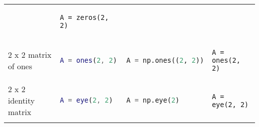 \documentclass[]{article}
\begin{document}
\begin{longtable}[]{@{}llll@{}}
\begin{minipage}[t]{0.25\columnwidth}
\strut
\end{minipage} & \begin{minipage}[t]{0.20\columnwidth}\raggedright\strut
\begin{lstlisting}
A = zeros(2, 2)
\end{lstlisting}
\strut
\end{minipage}\tabularnewline
\begin{minipage}[t]{0.24\columnwidth}\raggedright\strut
2 x 2 matrix of ones\strut
\end{minipage} & \begin{minipage}[t]{0.20\columnwidth}\raggedright\strut
\begin{lstlisting}[language=Matlab]
A = ones(2, 2)
\end{lstlisting}
\strut
\end{minipage} & \begin{minipage}[t]{0.25\columnwidth}\raggedright\strut
\begin{lstlisting}[language=Python]
A = np.ones((2, 2))
\end{lstlisting}
\strut
\end{minipage} & \begin{minipage}[t]{0.20\columnwidth}\raggedright\strut
\begin{lstlisting}
A = ones(2, 2)
\end{lstlisting}
\strut
\end{minipage}\tabularnewline
\begin{minipage}[t]{0.24\columnwidth}\raggedright\strut
2 x 2 identity matrix\strut
\end{minipage} & \begin{minipage}[t]{0.20\columnwidth}\raggedright\strut
\begin{lstlisting}[language=Matlab]
A = eye(2, 2)
\end{lstlisting}
\strut
\end{minipage} & \begin{minipage}[t]{0.25\columnwidth}\raggedright\strut
\begin{lstlisting}[language=Python]
A = np.eye(2)
\end{lstlisting}
\strut
\end{minipage} & \begin{minipage}[t]{0.20\columnwidth}\raggedright\strut
\begin{lstlisting}
A = eye(2, 2)
\end{lstlisting}
\strut
\end{minipage}\tabularnewline
\begin{minipage}[t]{0.24\columnwidth}\raggedright\strut

\end{minipage}
\end{longtable}
\end{document}
